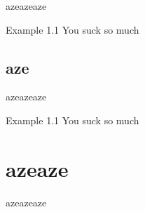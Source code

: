 \documentclass[aspectratio=169,compress]{beamer}
\begin{document}
\begin{CJK}{UTF8}{min}
\begin{frame}{azeazeaze}
\vspace{1em}
\begin{block}{Example 1.1}
You suck so much
\end{block}

\end{frame}\subsection{aze}
\begin{frame}{azeazeaze}

\vspace{1em}
\begin{block}{Example 1.1}
You suck so much
\end{block}

\end{frame}
\section{azeaze}
\begin{frame}{aze}azeaze\end{frame}
\end{CJK}
\end{document}
